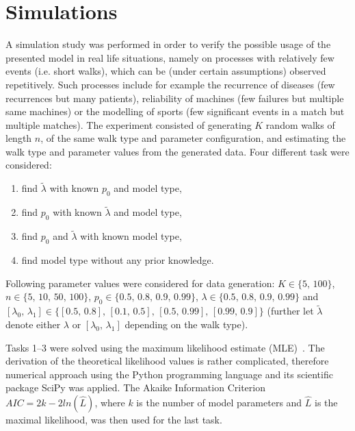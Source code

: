 \documentclass{amsart}
\theoremstyle{definition}
\theoremstyle{plain}
\theoremstyle{plain}
\theoremstyle{plain}
\numberwithin{equation}{section}
\begin{document}
    \section{Simulations}\label{sec:Simulations}

    A simulation study was performed in order to verify the possible usage of the presented model in real life situations, namely on processes with relatively few events (i.e. short walks), which can be (under certain assumptions) observed repetitively.
    Such processes include for example the recurrence of diseases (few recurrences but many patients), reliability of machines (few failures but multiple same machines) or the modelling of sports (few significant events in a match but multiple matches).
    The experiment consisted {\color{red}of} generating $K$ random walks of length $n$, of the same walk type and parameter configuration, and estimating the walk type and parameter values from the generated data.
    Four different task were considered:
    \begin{enumerate}
        \color{red}
        \item find $\tilde{\lambda}$ with known $p_{0}$ and model type,
        \item find $p_{0}$ with known $\tilde{\lambda}$ and model type,
        \item find $p_{0}$ and $\tilde{\lambda}$ with known model type,
        \item find model type without any prior knowledge.
    \end{enumerate}
    Following parameter values were considered for data generation: $K\in\{5,\,100\}$, $n\in\{5,\,10,\,50,\,100\}$, $p_{0}\in\{0.5,\,0.8,\,0.9,\,0.99\}$, $\lambda\in\{0.5,\,0.8,\,0.9,\,0.99\}$ and $[\lambda_{0},\,\lambda_{1}]\in\{[0.5,\,0.8],\,[0.1,\,0.5],\,[0.5,\,0.99],\,[0.99,\,0.9]\}$
    (further let $\tilde{\lambda}$ denote either $\lambda$ or $[\lambda_{0},\,\lambda_{1}]$ depending on the walk type).


    Tasks 1--3 were solved using the maximum likelihood estimate (MLE)~\cite{rossi2018mathematical}.
    The derivation of the theoretical likelihood values is rather complicated, therefore numerical approach using the Python programming language and its scientific package SciPy was applied.
    The Akaike Information Criterion $AIC=2k-2ln(\hat{L})$, where $k$ is the number of model parameters and $\hat{L}$ is the maximal likelihood, was then used for the last task.
\end{document}
